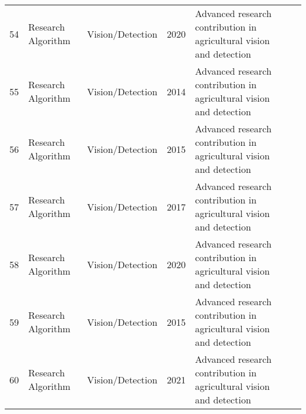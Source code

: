 \begin{table*}[htbp]
\begin{tabular}{p{}p{}p{}p{}p{}p{}}
 54 & Research Algorithm & Vision/Detection & 2020 & Advanced research contribution in agricultural vision and detection & \cite{khanal2020remote} \\
 55 & Research Algorithm & Vision/Detection & 2014 & Advanced research contribution in agricultural vision and detection & \cite{kim2014development} \\
 56 & Research Algorithm & Vision/Detection & 2015 & Advanced research contribution in agricultural vision and detection & \cite{koenig2015comparative} \\
 57 & Research Algorithm & Vision/Detection & 2017 & Advanced research contribution in agricultural vision and detection & \cite{kusumam20173d} \\
 58 & Research Algorithm & Vision/Detection & 2020 & Advanced research contribution in agricultural vision and detection & \cite{kuznetsova2020using} \\
 59 & Research Algorithm & Vision/Detection & 2015 & Advanced research contribution in agricultural vision and detection & \cite{lalander2015vermicomposting} \\
 60 & Research Algorithm & Vision/Detection & 2021 & Advanced research contribution in agricultural vision and detection & \cite{lawal2021tomato} \\
\bottomrule
\end{tabular}
\end{table*}

